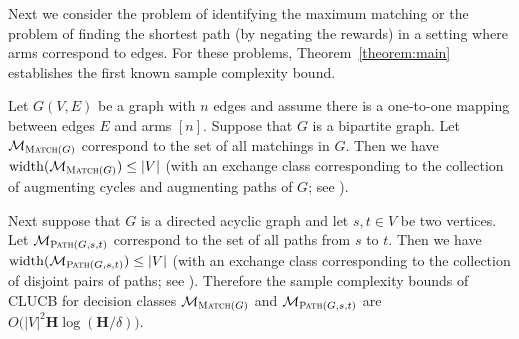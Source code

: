 \documentclass{article}
\newcommand{\Algorithm}{{\small \textsf{CLUCB}}\xspace}
\newcommand{\M}{\mathcal M}
\DeclareMathOperator{\rank}{width}
\newcommand{\Match}{\textsc{Match}\xspace}
\newcommand{\Path}{\textsc{Path}\xspace}
\begin{document}
Next we consider the problem of identifying the maximum matching or the problem of finding the shortest path (by negating the rewards) in a setting where arms correspond to edges.
For these problems, Theorem~\ref{theorem:main} establishes the first known sample complexity bound.
\begin{example}
Let $G(V,E)$ be a graph with $n$ edges and assume there is a one-to-one mapping between edges $E$ and arms $[n]$.
Suppose that $G$ is a bipartite graph. 
Let $\M_{\Match(G)}$ correspond to the set of all matchings in $G$.
Then we have $\rank(\M_{\Match(G)}) \le |V|$ (with an exchange class corresponding to the collection of augmenting cycles and augmenting paths of $G$; see ).

Next suppose that $G$ is a directed acyclic graph and let $s,t\in V$ be two vertices.
Let $\M_{\Path(G,s,t)}$ correspond to the set of all paths from $s$ to $t$.
Then we have $\rank(\M_{\Path(G,s,t)}) \le |V|$ (with an exchange class corresponding to the collection of disjoint pairs of paths; see ).
Therefore the sample complexity bounds of \Algorithm for decision classes $\M_{\Match(G)}$ and $\M_{\Path(G,s,t)}$ are $O\big(|V|^2 \mathbf H \log (\mathbf H/\delta)\big)$.
\end{example}
\end{document}
